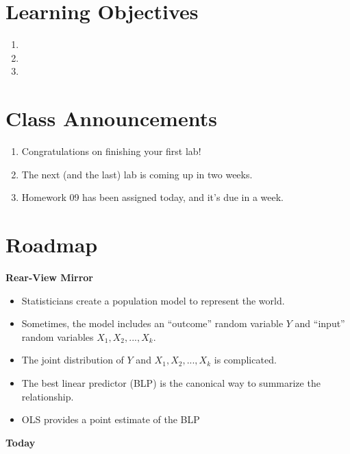 \documentclass[
]{book}
\providecommand{\tightlist}{%
  \setlength{\itemsep}{0pt}\setlength{\parskip}{0pt}}
\theoremstyle{definition}
\theoremstyle{definition}
\theoremstyle{definition}
\theoremstyle{definition}
\theoremstyle{remark}
\begin{document}
\hypertarget{learning-objectives-8}{%
\section{Learning Objectives}\label{learning-objectives-8}}

\begin{enumerate}
\def\labelenumi{\arabic{enumi}.}
\tightlist
\item
\item
\item
\end{enumerate}

\hypertarget{class-announcements-7}{%
\section{Class Announcements}\label{class-announcements-7}}

\begin{enumerate}
\def\labelenumi{\arabic{enumi}.}
\tightlist
\item
  Congratulations on finishing your first lab!
\item
  The next (and the last) lab is coming up in two weeks.
\item
  Homework 09 has been assigned today, and it's due in a week.
\end{enumerate}

\hypertarget{roadmap-5}{%
\section{Roadmap}\label{roadmap-5}}

\textbf{Rear-View Mirror}

\begin{itemize}
\tightlist
\item
  Statisticians create a population model to represent the world.
\item
  Sometimes, the model includes an ``outcome'' random variable \(Y\) and ``input'' random variables \(X_1, X_2,...,X_k\).
\item
  The joint distribution of \(Y\) and \(X_1, X_2,...,X_k\) is complicated.
\item
  The best linear predictor (BLP) is the canonical way to summarize the relationship.
\item
  OLS provides a point estimate of the BLP
\end{itemize}

\textbf{Today}
\end{document}
